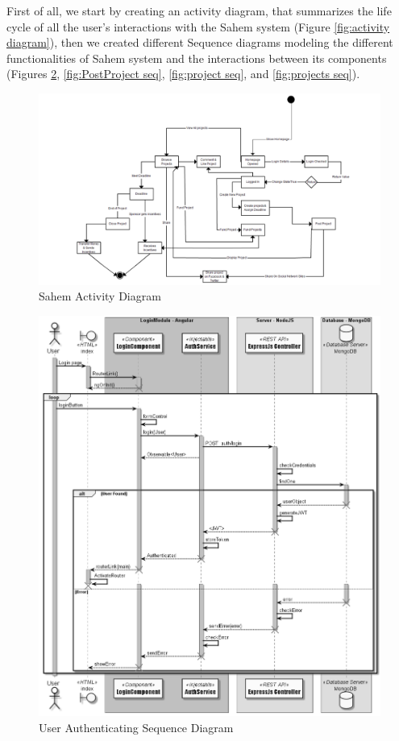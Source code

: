 First of all, we start by creating an activity diagram, that summarizes the life cycle of all the user's interactions with the Sahem system (Figure \ref{fig:activity diagram}), then we created different Sequence diagrams modeling the different functionalities of Sahem system and the interactions between its components (Figures \ref{fig:authentication seq}, \ref{fig:PostProject seq}, \ref{fig:project seq}, and \ref{fig:projects seq}).

\begin{figure}[!ht]
      \center
      \includegraphics[scale=0.51]{assets/activity.png}
      \caption{Sahem Activity Diagram}
      \label{fig:activity diagrma}
\end{figure}

\begin{figure}[!ht]
      \center
      \includegraphics[scale=0.45]{assets/authentication.png}
      \caption{User Authenticating Sequence Diagram}
      \label{fig:authentication seq}

\end{figure}

